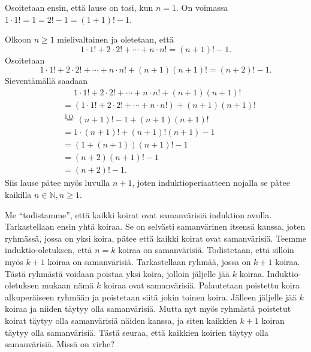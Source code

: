 \documentclass[11pt,a4paper]{amsart}
\begin{document}
\begin{solution}
  Osoitetaan ensin, että lause on tosi, kun \(n = 1\). On voimassa
  \(1 \cdot 1! = 1 = 2! - 1 = (1 + 1)! - 1\).

  Olkoon \(n \geq 1\) mielivaltainen ja oletetaan, että
  \[
    1 \cdot 1! + 2 \cdot 2! + \cdots + n \cdot n! = (n + 1)! - 1.
  \]
  Osoitetaan
  \[
    1 \cdot 1! + 2 \cdot 2! + \cdots + n \cdot n!
    + (n + 1)(n + 1)! = (n + 2)! - 1.
  \]
  Sieventämällä saadaan
  \begin{align*}
    &\phantom{{}={}} 1 \cdot 1! + 2 \cdot 2! + \cdots + n \cdot n!
    + (n + 1)(n + 1)! \\
    &= \left(1 \cdot 1! + 2 \cdot 2! + \cdots + n \cdot n!\right)
    + (n + 1)(n + 1)! \\
    &\overset{\text{I.O.}}{=} (n + 1)! - 1 + (n + 1)(n + 1)! \\
    &= 1 \cdot (n + 1)! + (n + 1)!(n + 1) - 1 \\
    &= \left(1 + (n + 1)\right)(n + 1)! - 1 \\
    &= (n + 2)(n + 1)! - 1 \\
    &= (n + 2)! - 1.
  \end{align*}
  Siis lause pätee myös luvulla \(n + 1\), joten induktioperiaatteen
  nojalla se pätee kaikilla \(n \in \mathbb{N}, n \geq 1\).
\end{solution}

\begin{exercise}
  Me ``todistamme'', että kaikki koirat ovat samanvärisiä induktion avulla.
  Tarkastellaan ensin yhtä koiraa. Se on selvästi samanvärinen itsensä kanssa,
  joten ryhmässä, jossa on yksi koira, pätee että kaikki koirat ovat
  samanvärisiä. Teemme induktio-oletuksen, että \(n = k\) koiraa on
  samanvärisiä. Todistetaan, että silloin myös \(k + 1\) koiraa on
  samanvärisiä. Tarkastellaan ryhmää, jossa on \(k + 1\) koiraa. Tästä
  ryhmästä voidaan poistaa yksi koira, jolloin jäljelle jää \(k\) koiraa.
  Induktio-oletuksen mukaan nämä \(k\) koiraa ovat samanvärisiä. Palautetaan
  poistettu koira alkuperäiseen ryhmään ja poistetaan siitä jokin toinen
  koira. Jälleen jäljelle jää \(k\) koiraa ja niiden täytyy olla
  samanvärisiä. Mutta nyt myös ryhmästä poistetut koirat täytyy olla
  samanvärisiä näiden kanssa, ja siten kaikkien \(k + 1\) koiran täytyy olla
  samanvärisiä. Tästä seuraa, että kaikkien koirien täytyy olla samanvärisiä.
  Missä on virhe?
\end{exercise}
\end{document}
